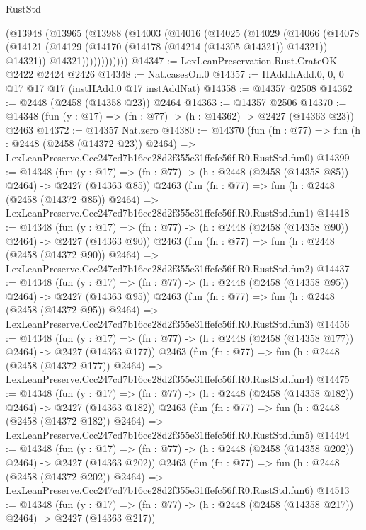 \begin{lexlean}{RustStd}
\begin{coremodule}
          (@13948
            (@13965
              (@13988
                (@14003
                  (@14016
                    (@14025
                      (@14029
                        (@14066
                          (@14078
                            (@14121
                              (@14129 (@14170 (@14178 (@14214 (@14305 @14321)) @14321)) @14321))
                            @14321))))))))))))
@14347 := LexLeanPreservation.Rust.CrateOK @2422 @2424 @2426
@14348 := Nat.casesOn.{0}
@14357 := HAdd.hAdd.{0, 0, 0} @17 @17 @17 (instHAdd.{0} @17 instAddNat)
@14358 := @14357 @2508
@14362 := @2448 (@2458 (@14358 @23)) @2464
@14363 := @14357 @2506
@14370 := @14348 (fun (y : @17) => (fn : @77) -> (h : @14362) -> @2427 (@14363 @23)) @2463
@14372 := @14357 Nat.zero
@14380 := @14370
    (fun (fn : @77) =>
    fun (h : @2448 (@2458 (@14372 @23)) @2464) =>
    LexLeanPreserve.Ccc247cd7b16ce28d2f355e31ffefc56f.R0.RustStd.fun0)
@14399 := @14348
    (fun (y : @17) => (fn : @77) -> (h : @2448 (@2458 (@14358 @85)) @2464) -> @2427 (@14363 @85))
    @2463
    (fun (fn : @77) =>
    fun (h : @2448 (@2458 (@14372 @85)) @2464) =>
    LexLeanPreserve.Ccc247cd7b16ce28d2f355e31ffefc56f.R0.RustStd.fun1)
@14418 := @14348
    (fun (y : @17) => (fn : @77) -> (h : @2448 (@2458 (@14358 @90)) @2464) -> @2427 (@14363 @90))
    @2463
    (fun (fn : @77) =>
    fun (h : @2448 (@2458 (@14372 @90)) @2464) =>
    LexLeanPreserve.Ccc247cd7b16ce28d2f355e31ffefc56f.R0.RustStd.fun2)
@14437 := @14348
    (fun (y : @17) => (fn : @77) -> (h : @2448 (@2458 (@14358 @95)) @2464) -> @2427 (@14363 @95))
    @2463
    (fun (fn : @77) =>
    fun (h : @2448 (@2458 (@14372 @95)) @2464) =>
    LexLeanPreserve.Ccc247cd7b16ce28d2f355e31ffefc56f.R0.RustStd.fun3)
@14456 := @14348
    (fun (y : @17) => (fn : @77) -> (h : @2448 (@2458 (@14358 @177)) @2464) -> @2427 (@14363 @177))
    @2463
    (fun (fn : @77) =>
    fun (h : @2448 (@2458 (@14372 @177)) @2464) =>
    LexLeanPreserve.Ccc247cd7b16ce28d2f355e31ffefc56f.R0.RustStd.fun4)
@14475 := @14348
    (fun (y : @17) => (fn : @77) -> (h : @2448 (@2458 (@14358 @182)) @2464) -> @2427 (@14363 @182))
    @2463
    (fun (fn : @77) =>
    fun (h : @2448 (@2458 (@14372 @182)) @2464) =>
    LexLeanPreserve.Ccc247cd7b16ce28d2f355e31ffefc56f.R0.RustStd.fun5)
@14494 := @14348
    (fun (y : @17) => (fn : @77) -> (h : @2448 (@2458 (@14358 @202)) @2464) -> @2427 (@14363 @202))
    @2463
    (fun (fn : @77) =>
    fun (h : @2448 (@2458 (@14372 @202)) @2464) =>
    LexLeanPreserve.Ccc247cd7b16ce28d2f355e31ffefc56f.R0.RustStd.fun6)
@14513 := @14348
    (fun (y : @17) => (fn : @77) -> (h : @2448 (@2458 (@14358 @217)) @2464) -> @2427 (@14363 @217))

\end{coremodule}
\end{lexlean}
